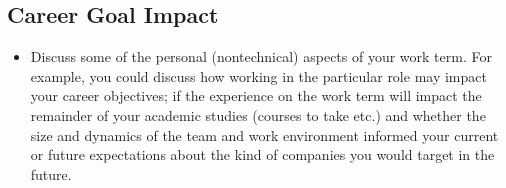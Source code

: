 \subsection*{Career Goal Impact}

\begin{itemize}
  \item Discuss some of the personal (nontechnical) aspects of your work term. For example, you could discuss how working in the particular role may impact your career objectives; if the experience on the work term will impact the remainder of your academic studies (courses to take etc.) and whether the size and dynamics of the team and work environment informed your current or future expectations about the kind of companies you would target in the future.
\end{itemize}
